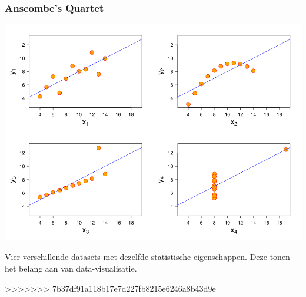 \documentclass{beamer}
\begin{document}
\begin{frame}
  \frametitle{Anscombe's Quartet}

  \centering
  \includegraphics[width=.8\textwidth]{img/anscombes_quartet}

  Vier verschillende datasets met dezelfde statistische eigenschappen. Deze tonen het belang aan van data-visualisatie.
\end{frame}
>>>>>>> 7b37df91a118b17e7d227fb8215e6246a8b43d9e
\end{document}
